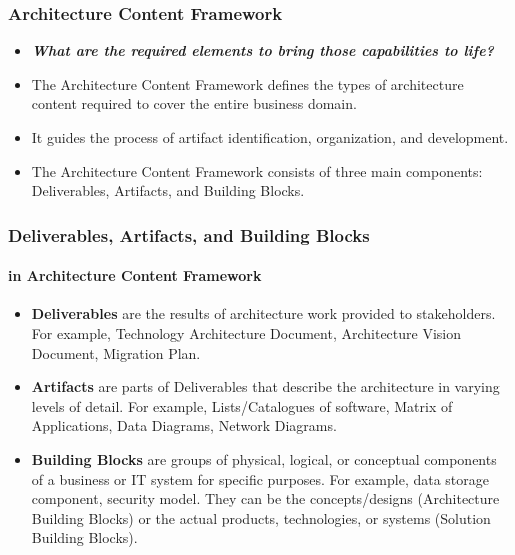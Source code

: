 \documentclass[aspectratio=169, table]{beamer}
\begin{document}
	\begin{frame}
		\frametitle{Architecture Content Framework}
		\begin{itemize}
			\item \textbf{\textit{What are the required elements to bring those capabilities to life?}}
			\item The Architecture Content Framework defines the types of architecture content required to cover the entire business domain.
			\item It guides the process of artifact identification, organization, and development.
			\item The Architecture Content Framework consists of three main components: Deliverables, Artifacts, and Building Blocks.
		\end{itemize}
	\end{frame}
	
	
	
	\begin{frame}
		\frametitle{Deliverables, Artifacts, and Building Blocks}
		\framesubtitle{in Architecture Content Framework}
		\begin{itemize}
			\item \textbf{Deliverables} are the results of architecture work provided to stakeholders. For example, Technology Architecture Document, Architecture Vision Document, Migration Plan.
			\item \textbf{Artifacts} are parts of Deliverables that describe the architecture in varying levels of detail. For example, Lists/Catalogues of software, Matrix of Applications, Data Diagrams, Network Diagrams. 
			\item \textbf{Building Blocks} are groups of physical, logical, or conceptual components of a business or IT system for specific purposes. For example, data storage component, security model. They can be the concepts/designs (Architecture Building Blocks) or the actual products, technologies, or systems (Solution Building Blocks).
		\end{itemize}
	\end{frame}
	
\end{document}
